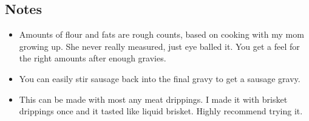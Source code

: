 \begin{multicols}{2}
\subsection*{Notes}
\begin{itemize}
    \item Amounts of flour and fats are rough counts, based on cooking with my mom growing up. She never really measured, just eye balled it. You get a feel for the right amounts after enough gravies.
    \item You can easily stir sausage back into the final gravy to get a sausage gravy.
    \item This can be made with most any meat drippings. I made it with brisket drippings once and it tasted like liquid brisket. Highly recommend trying it.
\end{itemize}
\end{multicols}
\clearpage